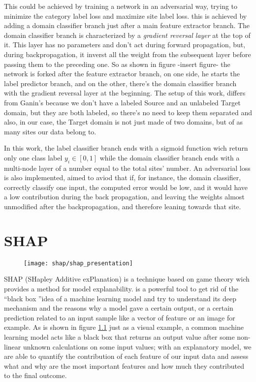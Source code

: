 \documentclass[10pt]{report}
\begin{document}
This could be achieved by training a network in an adversarial way, trying to minimize the category label loss and maximize site label loss.
this is achieved by adding a domain classifier branch just after a main feature extractor branch.
The domain classifier branch is characterized by a \emph{gradient reversal layer} at the top of it.
This layer has no parameters and don't act during forward propagation, but, during backpropagation, it inverst all the weight from the subsequent layer before passing them to the preceding one.
So as shown in figure -insert figure- the network is forked after the feature extractor branch, on one side, he starts the label predictor branch, and on the other, there's the domain classifier branch with the gradient reversal layer at the beginning.
The setup of this work, differs from Ganin's because we don't have a labeled Source and an unlabeled Target domain, but they are both labeled, so there's no need to keep them separated and also, in our case, the Target domain is not just made of two domains, but of as many sites our data belong to.


In this work, the label classifier branch ends with a sigmoid function wich return only one class label $y_i \in [0, 1]$ while the domain classifier branch ends with a multi-node layer of a number equal to the total sites' number.
An adversarial loss is also implemented, aimed to aviod that if, for instance, the domain classifier, correctly classify one input, the computed error would be low, and it would have a low contribution during the back propagation, and leaving the weights almost unmodified after the backpropagation, and therefore leaning towards that site.





\chapter{SHAP}\label{sec:shap}



\begin{figure}[h]
\centering
\texttt{[image: shap/shap\_presentation]}
\caption{}\label{fig:shap_waterfall_example}
\end{figure}


SHAP (SHapley Additive exPlanation) is a technique based on game theory wich provides a method for model explanability.
is a powerful tool to get rid of the \textquotedblleft black box \textquotedblright idea of a machine learning model and try to understand its deep mechanism and the reasons why a model gave a certain output, or a certain prediction related to an input sample like a vector of feature or an image for example.
As is shown in figure \ref{fig:shap_waterfall_example} just as a visual example, a common machine learning model acts like a black box that returns an output value after some non-linear unknown calculations on some input values; with an explanatory model, we are able to quantify the contribution of each feature of our input data and assess what and why are the most important features and how much they contributed to the final outcome.
\end{document}
